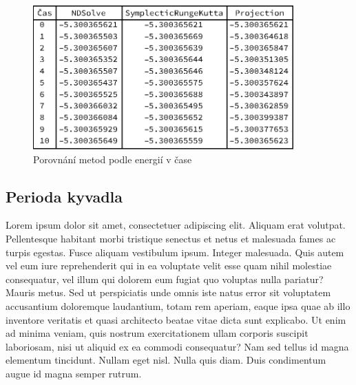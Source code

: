 \begin{description}
\begin{figure}[h]
  \centering
  \includegraphics[width=10cm]{figures/TAB1.eps}
  \caption{Porovnání metod podle energií v čase}
  \label{fig:tab}
\end{figure}



\end{description}

\subsection{Perioda kyvadla}
\label{sec:Perioda}

 Lorem ipsum dolor sit amet, consectetuer adipiscing elit. Aliquam erat volutpat. Pellentesque habitant morbi tristique senectus et netus et malesuada fames ac turpis egestas. Fusce aliquam vestibulum ipsum. Integer malesuada. Quis autem vel eum iure reprehenderit qui in ea voluptate velit esse quam nihil molestiae consequatur, vel illum qui dolorem eum fugiat quo voluptas nulla pariatur? Mauris metus. Sed ut perspiciatis unde omnis iste natus error sit voluptatem accusantium doloremque laudantium, totam rem aperiam, eaque ipsa quae ab illo inventore veritatis et quasi architecto beatae vitae dicta sunt explicabo. Ut enim ad minima veniam, quis nostrum exercitationem ullam corporis suscipit laboriosam, nisi ut aliquid ex ea commodi consequatur? Nam sed tellus id magna elementum tincidunt. Nullam eget nisl. Nulla quis diam. Duis condimentum augue id magna semper rutrum.





